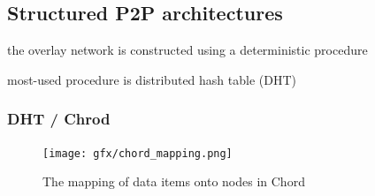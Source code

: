\documentclass[ngerman,a4paper]{report}
\begin{document}
\subsection{Structured P2P architectures}

\begin{compactitem}
	\item the overlay network is constructed using a deterministic procedure
	\item most-used procedure is distributed hash table (DHT)	
\end{compactitem}


\subsubsection{DHT / Chrod}

\begin{figure}[h]
	\centering
	\texttt{[image: gfx/chord\_mapping.png]}
	\caption{The mapping of data items onto nodes in Chord}
	\label{img:chord_mapping}
\end{figure}
\end{document}
